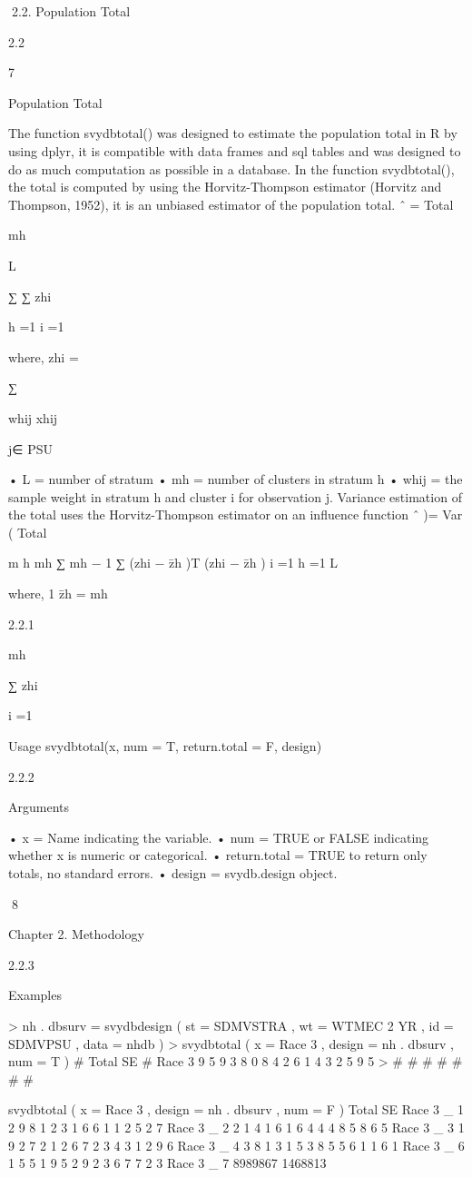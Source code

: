 2.2. Population Total

2.2

7

Population Total

The function svydbtotal() was designed to estimate the population total in R by
using dplyr, it is compatible with data frames and sql tables and was designed to do
as much computation as possible in a database.
In the function svydbtotal(), the total is computed by using the Horvitz-Thompson
estimator (Horvitz and Thompson, 1952), it is an unbiased estimator of the population total.
ˆ =
Total

mh

L

∑ ∑ zhi

h =1 i =1

where,
zhi =

∑

whij xhij

j∈ PSU

• L = number of stratum
• mh = number of clusters in stratum h
• whij = the sample weight in stratum h and cluster i for observation j.
Variance estimation of the total uses the Horvitz-Thompson estimator on an influence function
ˆ )=
Var ( Total

m h mh
∑ mh − 1 ∑ (zhi − z̄h )T (zhi − z̄h )
i =1
h =1
L

where,
1
z̄h =
mh

2.2.1

mh

∑ zhi

i =1

Usage
svydbtotal(x, num = T, return.total = F, design)

2.2.2

Arguments

• x = Name indicating the variable.
• num = TRUE or FALSE indicating whether x is numeric or categorical.
• return.total = TRUE to return only totals, no standard errors.
• design = svydb.design object.

8

Chapter 2. Methodology

2.2.3

Examples

> nh . dbsurv = svydbdesign ( st = SDMVSTRA , wt = WTMEC 2 YR ,
id = SDMVPSU , data = nhdb )
> svydbtotal ( x = Race 3 , design = nh . dbsurv , num = T )
#
Total
SE
# Race 3 9 5 9 3 8 0 8 4 2 6 1 4 3 2 5 9 5
>
#
#
#
#
#
#
#

svydbtotal ( x = Race 3 , design = nh . dbsurv , num = F )
Total
SE
Race 3 _ 1 2 9 8 1 2 3 1 6 6 1 1 2 5 2 7
Race 3 _ 2 2 1 4 1 6 1 6 4 4 4 8 5 8 6 5
Race 3 _ 3 1 9 2 7 2 1 2 6 7 2 3 4 3 1 2 9 6
Race 3 _ 4 3 8 1 3 1 5 3 8 5 5 6 1 1 6 1
Race 3 _ 6 1 5 5 1 9 5 2 9 2 3 6 7 7 2 3
Race 3 _ 7
8989867 1468813

